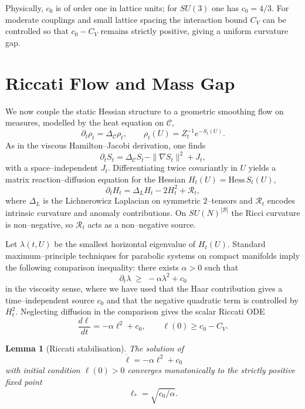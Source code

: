 \documentclass[11pt]{article}
\newtheorem{lemma}[theorem]{Lemma}
\begin{document}
Physically, $c_0$ is of order one in lattice units; for $SU(3)$ one has
$c_0 = 4/3$. For moderate couplings and small lattice spacing the
interaction bound $C_V$ can be controlled so that $c_0-C_V$ remains
strictly positive, giving a uniform curvature gap.

\section{Riccati Flow and Mass Gap}

We now couple the static Hessian structure to a geometric smoothing flow
on measures, modelled by the heat equation on $\mathcal{C}$,
\[
  \partial_t \rho_t = \Delta_{\mathcal{C}}\rho_t,
  \qquad
  \rho_t(U) = Z_t^{-1}e^{-S_t(U)}.
\]
As in the viscous Hamilton--Jacobi derivation, one finds
\begin{equation}
  \partial_t S_t = \Delta_{\mathcal{C}} S_t - \|\nabla S_t\|^2 + J_t,
\end{equation}
with a space--independent $J_t$. Differentiating twice covariantly in
$U$ yields a matrix reaction--diffusion equation for the Hessian
$H_t(U) = \mathrm{Hess}\,S_t(U)$,
\begin{equation}
  \partial_t H_t = \Delta_L H_t - 2H_t^2 + \mathcal{R}_t,
\end{equation}
where $\Delta_L$ is the Lichnerowicz Laplacian on symmetric
$2$--tensors and $\mathcal{R}_t$ encodes intrinsic curvature and
anomaly contributions. On $SU(N)^{|\mathcal{B}|}$ the Ricci curvature is
non--negative, so $\mathcal{R}_t$ acts as a non--negative source.

Let $\lambda(t,U)$ be the smallest horizontal eigenvalue of $H_t(U)$.
Standard maximum--principle techniques for parabolic systems on compact
manifolds imply the following comparison inequality: there exists
$\alpha>0$ such that
\begin{equation}
  \partial_t \lambda \;\ge\; -\alpha\lambda^2 + c_0
\end{equation}
in the viscosity sense, where we have used that the Haar contribution
gives a time--independent source $c_0$ and that the negative quadratic
term is controlled by $H_t^2$. Neglecting diffusion in the comparison
gives the scalar Riccati ODE
\begin{equation}
  \frac{d\ell}{dt} = -\alpha\ell^2 + c_0,\qquad \ell(0)\ge c_0-C_V.
\end{equation}

\begin{lemma}[Riccati stabilisation]
The solution of
\begin{equation}
  \dot\ell = -\alpha\ell^2 + c_0
\end{equation}
with initial condition $\ell(0)>0$ converges monotonically to the
strictly positive fixed point
\begin{equation}
  \ell_* = \sqrt{c_0/\alpha}.
\end{equation}
\end{lemma}
\end{document}
